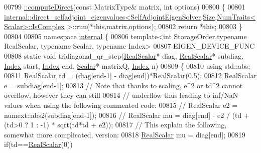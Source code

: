 \begin{DoxyCode}
00799 \hyperlink{group___eigenvalues___module_a40b0a68841d6176b1ab98743cc82bef4}{::computeDirect}(\textcolor{keyword}{const} MatrixType& matrix, \textcolor{keywordtype}{int} options)
00800 \{
00801   
      \hyperlink{struct_eigen_1_1internal_1_1direct__selfadjoint__eigenvalues}{internal::direct\_selfadjoint\_eigenvalues<SelfAdjointEigenSolver,Size,NumTraits<Scalar>::IsComplex}
      >::run(*\textcolor{keyword}{this},matrix,options);
00802   \textcolor{keywordflow}{return} *\textcolor{keyword}{this};
00803 \}
00804 
00805 \textcolor{keyword}{namespace }\hyperlink{namespaceinternal}{internal} \{
00806 \textcolor{keyword}{template}<\textcolor{keywordtype}{int} StorageOrder,\textcolor{keyword}{typename} RealScalar, \textcolor{keyword}{typename} Scalar, \textcolor{keyword}{typename} Index>
00807 EIGEN\_DEVICE\_FUNC
00808 \textcolor{keyword}{static} \textcolor{keywordtype}{void} tridiagonal\_qr\_step(\hyperlink{group___eigenvalues___module_a5dae5f422a3c71060e6bd31332bf64fd}{RealScalar}* diag, \hyperlink{group___eigenvalues___module_a5dae5f422a3c71060e6bd31332bf64fd}{RealScalar}* subdiag, 
      \hyperlink{group___eigenvalues___module_a8a59ab7734b6eae2754fd78bc7c3a360}{Index} start, \hyperlink{group___eigenvalues___module_a8a59ab7734b6eae2754fd78bc7c3a360}{Index} end, \hyperlink{group___eigenvalues___module_a0bfcedf4245b6846007ca4f01e4feb1f}{Scalar}* matrixQ, \hyperlink{group___eigenvalues___module_a8a59ab7734b6eae2754fd78bc7c3a360}{Index} n)
00809 \{
00810   \textcolor{keyword}{using} std::abs;
00811   \hyperlink{group___eigenvalues___module_a5dae5f422a3c71060e6bd31332bf64fd}{RealScalar} td = (diag[end-1] - diag[end])*\hyperlink{group___eigenvalues___module_a5dae5f422a3c71060e6bd31332bf64fd}{RealScalar}(0.5);
00812   \hyperlink{group___eigenvalues___module_a5dae5f422a3c71060e6bd31332bf64fd}{RealScalar} e = subdiag[end-1];
00813   \textcolor{comment}{// Note that thanks to scaling, e^2 or td^2 cannot overflow, however they can still}
00814   \textcolor{comment}{// underflow thus leading to inf/NaN values when using the following commented code:}
00815 \textcolor{comment}{//   RealScalar e2 = numext::abs2(subdiag[end-1]);}
00816 \textcolor{comment}{//   RealScalar mu = diag[end] - e2 / (td + (td>0 ? 1 : -1) * sqrt(td*td + e2));}
00817   \textcolor{comment}{// This explain the following, somewhat more complicated, version:}
00818   \hyperlink{group___eigenvalues___module_a5dae5f422a3c71060e6bd31332bf64fd}{RealScalar} mu = diag[end];
00819   \textcolor{keywordflow}{if}(td==\hyperlink{group___eigenvalues___module_a5dae5f422a3c71060e6bd31332bf64fd}{RealScalar}(0))

\end{DoxyCode}
